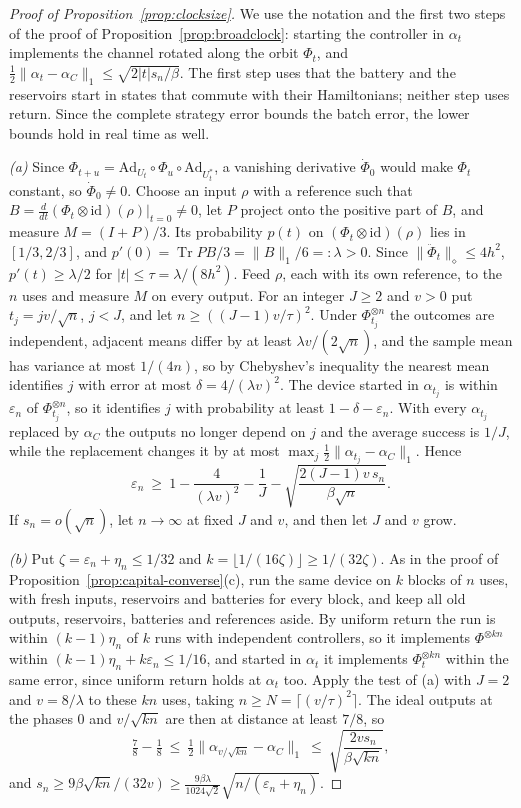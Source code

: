 \documentclass[11pt]{article}
\theoremstyle{definition}
\theoremstyle{remark}
\newcommand{\Tr}{\operatorname{Tr}}
\begin{document}
\begin{proof}[Proof of Proposition~\ref{prop:clocksize}]
We use the notation and the first two steps of the proof of Proposition~\ref{prop:broadclock}: starting the controller in $\alpha_t$ implements the channel rotated along the orbit $\Phi_t$, and $\tfrac12\|\alpha_t-\alpha_C\|_1\le\sqrt{2|t|s_n/\beta}$. The first step uses that the battery and the reservoirs start in states that commute with their Hamiltonians; neither step uses return. Since the complete strategy error bounds the batch error, the lower bounds hold in real time as well.

\emph{(a)} Since $\Phi_{t+u}=\mathrm{Ad}_{U_t}\circ\Phi_u\circ\mathrm{Ad}_{U_t^*}$, a vanishing derivative $\dot\Phi_0$ would make $\Phi_t$ constant, so $\dot\Phi_0\ne0$. Choose an input $\rho$ with a reference such that $B=\frac{d}{dt}(\Phi_t\otimes\mathrm{id})(\rho)|_{t=0}\neq0$, let $P$ project onto the positive part of $B$, and measure $M=(I+P)/3$. Its probability $p(t)$ on $(\Phi_t\otimes\mathrm{id})(\rho)$ lies in $[1/3,2/3]$, and $p'(0)=\Tr PB/3=\|B\|_1/6=:\lambda>0$. Since $\|\ddot\Phi_t\|_\diamond\le4h^2$, $p'(t)\ge\lambda/2$ for $|t|\le\tau=\lambda/(8h^2)$. Feed $\rho$, each with its own reference, to the $n$ uses and measure $M$ on every output. For an integer $J\ge2$ and $v>0$ put $t_j=jv/\sqrt n$, $j<J$, and let $n\ge((J-1)v/\tau)^2$. Under $\Phi_{t_j}^{\otimes n}$ the outcomes are independent, adjacent means differ by at least $\lambda v/(2\sqrt n)$, and the sample mean has variance at most $1/(4n)$, so by Chebyshev's inequality the nearest mean identifies $j$ with error at most $\delta=4/(\lambda v)^2$. The device started in $\alpha_{t_j}$ is within $\varepsilon_n$ of $\Phi_{t_j}^{\otimes n}$, so it identifies $j$ with probability at least $1-\delta-\varepsilon_n$. With every $\alpha_{t_j}$ replaced by $\alpha_C$ the outputs no longer depend on $j$ and the average success is $1/J$, while the replacement changes it by at most $\max_j\frac12\|\alpha_{t_j}-\alpha_C\|_1$. Hence
\[
\varepsilon_n\ \ge\ 1-\frac4{(\lambda v)^2}-\frac1J-\sqrt{\frac{2(J-1)v\,s_n}{\beta\sqrt n}}.
\]
If $s_n=o(\sqrt n)$, let $n\to\infty$ at fixed $J$ and $v$, and then let $J$ and $v$ grow.

\emph{(b)} Put $\zeta=\varepsilon_n+\eta_n\le1/32$ and $k=\lfloor1/(16\zeta)\rfloor\ge1/(32\zeta)$. As in the proof of Proposition~\ref{prop:capital-converse}(c), run the same device on $k$ blocks of $n$ uses, with fresh inputs, reservoirs and batteries for every block, and keep all old outputs, reservoirs, batteries and references aside. By uniform return the run is within $(k-1)\eta_n$ of $k$ runs with independent controllers, so it implements $\Phi^{\otimes kn}$ within $(k-1)\eta_n+k\varepsilon_n\le1/16$, and started in $\alpha_t$ it implements $\Phi_t^{\otimes kn}$ within the same error, since uniform return holds at $\alpha_t$ too. Apply the test of (a) with $J=2$ and $v=8/\lambda$ to these $kn$ uses, taking $n\ge N=\lceil(v/\tau)^2\rceil$. The ideal outputs at the phases $0$ and $v/\sqrt{kn}$ are then at distance at least $7/8$, so
\[
\tfrac78-\tfrac18\ \le\ \tfrac12\|\alpha_{v/\sqrt{kn}}-\alpha_C\|_1\ \le\ \sqrt{\frac{2vs_n}{\beta\sqrt{kn}}},
\]
and $s_n\ge9\beta\sqrt{kn}/(32v)\ge\frac{9\beta\lambda}{1024\sqrt2}\sqrt{n/(\varepsilon_n+\eta_n)}$.


\end{proof}
\end{document}

